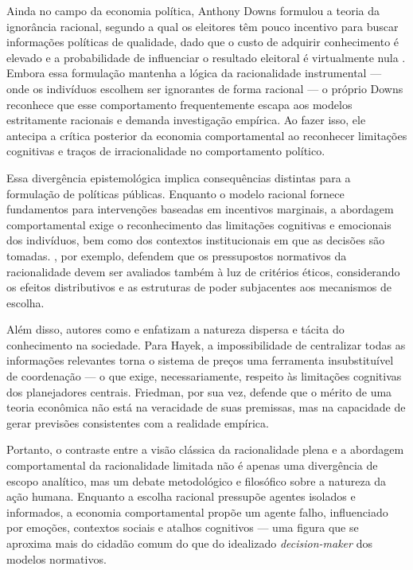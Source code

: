 Ainda no campo da economia política, Anthony Downs formulou a teoria da ignorância racional, segundo a qual os eleitores têm pouco incentivo para buscar informações políticas de qualidade, dado que o custo de adquirir conhecimento é elevado e a probabilidade de influenciar o resultado eleitoral é virtualmente nula \cite{downs1957economic}. Embora essa formulação mantenha a lógica da racionalidade instrumental — onde os indivíduos escolhem ser ignorantes de forma racional — o próprio Downs reconhece que esse comportamento frequentemente escapa aos modelos estritamente racionais e demanda investigação empírica. Ao fazer isso, ele antecipa a crítica posterior da economia comportamental ao reconhecer limitações cognitivas e traços de irracionalidade no comportamento político.

Essa divergência epistemológica implica consequências distintas para a formulação de políticas públicas. Enquanto o modelo racional fornece fundamentos para intervenções baseadas em incentivos marginais, a abordagem comportamental exige o reconhecimento das limitações cognitivas e emocionais dos indivíduos, bem como dos contextos institucionais em que as decisões são tomadas. , por exemplo, defendem que os pressupostos normativos da racionalidade devem ser avaliados também à luz de critérios éticos, considerando os efeitos distributivos e as estruturas de poder subjacentes aos mecanismos de escolha.

Além disso, autores como  e  enfatizam a natureza dispersa e tácita do conhecimento na sociedade. Para Hayek, a impossibilidade de centralizar todas as informações relevantes torna o sistema de preços uma ferramenta insubstituível de coordenação — o que exige, necessariamente, respeito às limitações cognitivas dos planejadores centrais. Friedman, por sua vez, defende que o mérito de uma teoria econômica não está na veracidade de suas premissas, mas na capacidade de gerar previsões consistentes com a realidade empírica.

Portanto, o contraste entre a visão clássica da racionalidade plena e a abordagem comportamental da racionalidade limitada não é apenas uma divergência de escopo analítico, mas um debate metodológico e filosófico sobre a natureza da ação humana. Enquanto a escolha racional pressupõe agentes isolados e informados, a economia comportamental propõe um agente falho, influenciado por emoções, contextos sociais e atalhos cognitivos — uma figura que se aproxima mais do cidadão comum do que do idealizado \textit{decision-maker} dos modelos normativos.

